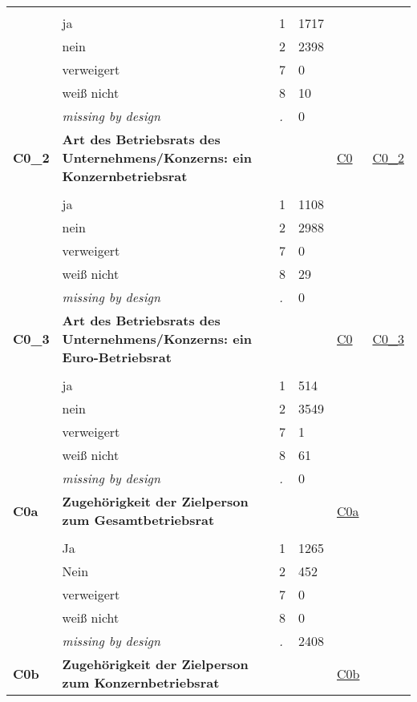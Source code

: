 \begin{longtable}{| L{2.45cm} | L{6cm} | C{1.5cm} | R{1cm} | C{2.25cm} | C{2.25cm} |}
   &  &  &  &  &  \\ 
   & ja & 1 & 1717 &  &  \\ 
   & nein & 2 & 2398 &  &  \\ 
   & verweigert & 7 & 0 &  &  \\ 
   & weiß nicht & 8 & 10 &  &  \\ 
   & \textit{missing by design} & \textit{.} & 0 &  &  \\ 
   \midrule
\textbf{C0\_2}\label{var:C0:2} & \textbf{Art des Betriebsrats des Unternehmens/Konzerns: ein Konzernbetriebsrat} &  &  & \hyperref[C0]{C0} & \hyperref[var:suf:C0:2]{C0\_2} \\ 
   &  &  &  &  &  \\ 
   & ja & 1 & 1108 &  &  \\ 
   & nein & 2 & 2988 &  &  \\ 
   & verweigert & 7 & 0 &  &  \\ 
   & weiß nicht & 8 & 29 &  &  \\ 
   & \textit{missing by design} & \textit{.} & 0 &  &  \\ 
   \midrule
\textbf{C0\_3}\label{var:C0:3} & \textbf{Art des Betriebsrats des Unternehmens/Konzerns: ein Euro-Betriebsrat} &  &  & \hyperref[C0]{C0} & \hyperref[var:suf:C0:3]{C0\_3} \\ 
   &  &  &  &  &  \\ 
   & ja & 1 & 514 &  &  \\ 
   & nein & 2 & 3549 &  &  \\ 
   & verweigert & 7 & 1 &  &  \\ 
   & weiß nicht & 8 & 61 &  &  \\ 
   & \textit{missing by design} & \textit{.} & 0 &  &  \\ 
   \midrule
\textbf{C0a}\label{var:C0a} & \textbf{Zugehörigkeit der Zielperson zum Gesamtbetriebsrat} &  &  & \hyperref[C0a]{C0a} & \hyperref[var:suf:]{} \\ 
   &  &  &  &  &  \\ 
   & Ja & 1 & 1265 &  &  \\ 
   & Nein & 2 & 452 &  &  \\ 
   & verweigert & 7 & 0 &  &  \\ 
   & weiß nicht & 8 & 0 &  &  \\ 
   & \textit{missing by design} & \textit{.} & 2408 &  &  \\ 
   \midrule
\textbf{C0b}\label{var:C0b} & \textbf{Zugehörigkeit der Zielperson zum Konzernbetriebsrat} &  &  & \hyperref[C0b]{C0b} & \hyperref[var:suf:]{} \\ 

\end{longtable}
